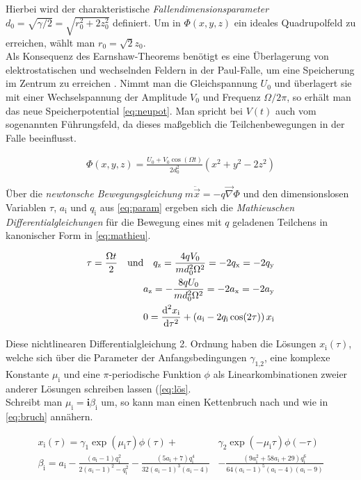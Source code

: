 \documentclass[numbers=noenddot,a4paper,notitlepage,twoside,BCOR15mm]{scrartcl}
\newcommand{\diff}{\textnormal{d}}
\newcommand{\ix}[1]{_\text{#1}}
\newcommand{\imag}{\mathbf{i}}
\newcommand{\tilt}[1]{\textit{#1}}
\begin{document}
		Hierbei wird der charakteristische \tilt{Fallendimensionsparameter} $d\ix{0}=\sqrt{\gamma/2}=\sqrt{r\ix{0}^2+2z\ix{0}^2}$ definiert. Um in $\Phi(x,y,z)$ ein ideales Quadrupolfeld zu erreichen, wählt man $r\ix{0}=\sqrt{2}z\ix{0}$.\\
		Als Konsequenz des Earnshaw-Theorems benötigt es eine Überlagerung von elektrostatischen und wechselnden Feldern in der Paul-Falle, um eine Speicherung im Zentrum zu erreichen \cite{EarnPaul} \cite{Paul}. Nimmt man die Gleichspannung $U\ix{0}$ und überlagert sie mit einer Wechselspannung der Amplitude $V\ix{0}$ und Frequenz $\Omega/2\pi$, so erhält man das neue Speicherpotential \autoref{eq:neupot}. Man spricht bei $V(t)$ auch vom sogenannten Führungsfeld, da dieses maßgeblich die Teilchenbewegungen in der Falle beeinflusst.

			\begin{align}
				\Phi(x,y,z)=\frac{U\ix{0}+V\ix{0}\cos(\Omega t)}{2d\ix{0}^2}(x^2+y^2-2z^2) \label{eq:neupot}
			\end{align}

		Über die \tilt{newtonsche Bewegungsgleichung} $m\ddot{\vec{x}}=-q\vec{\nabla}\Phi$ und den dimensionslosen Variablen $\tau$, $a\ix{i}$ und $q\ix{i}$ aus \autoref{eq:param} ergeben sich die \tilt{Mathieuschen Differentialgleichungen} für die Bewegung eines mit $q$ geladenen Teilchens in kanonischer Form in \autoref{eq:mathieu}.

			\begin{align}
				\tau=\frac{\Omega t}{2} \quad \text{und} \quad q\ix{z}=\frac{4qV\ix{0}}{md\ix{0}^2\Omega^2}=-2q\ix{x}=-2q\ix{y} \label{eq:param}\\
				a\ix{z}=-\frac{8qU\ix{0}}{md\ix{0}^2\Omega^2}=-2a\ix{x}=-2a\ix{y} \nonumber \\
				0=\frac{\diff^2x\ix{i}}{\diff\tau^2}+\left(a\ix{i}-2q\ix{i}\cos(2\tau)\right)x\ix{i} \label{eq:mathieu}
			\end{align}

		Diese nichtlinearen Differentialgleichung 2. Ordnung haben die Lösungen $x\ix{i}(\tau)$, welche sich über die Parameter der Anfangsbedingungen $\gamma\ix{1,2}$, eine komplexe Konstante $\mu\ix{i}$ und eine $\pi$-periodische Funktion $\phi$ als Linearkombinationen zweier anderer Lösungen schreiben lassen (\autoref{eq:lös}.\\
		Schreibt man $\mu\ix{i}=\imag\beta\ix{i}$ um, so kann man einen Kettenbruch nach \cite{Bruch} und \cite{Bruch2} wie in \autoref{eq:bruch} annähern.

			\begin{align}
				x\ix{i}(\tau)=\gamma\ix{1}\exp(\mu\ix{i}\tau)\phi(\tau)+&\gamma\ix{2}\exp(-\mu\ix{i}\tau)\phi(-\tau) \label{eq:lös} \\
				\beta\ix{i}=a\ix{i}-\frac{(a\ix{i}-1)q\ix{i}^2}{2(a\ix{i}-1)^2-q\ix{i}^2}-\frac{(5a\ix{i}+7)q\ix{i}^4}{32(a\ix{i}-1)^3(a\ix{i}-4)}&-\frac{(9a\ix{i}^2+58a\ix{i}+29)q\ix{i}^6}{64(a\ix{i}-1)^5(a\ix{i}-4)(a\ix{i}-9)} \label{eq:bruch}
			\end{align}
\end{document}
